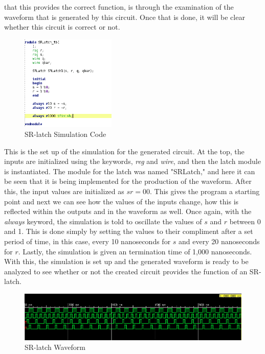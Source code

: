 \documentclass[12pt]{article}
\begin{document}
    that this provides the correct function, is through the examination of the
    waveform that is generated by this circuit. Once that is done, it will be
    clear whether this circuit is correct or not.
    \begin{figure}[h]
        \centering
        \includegraphics[width=0.4\textwidth]{SRLatch Simulation Code.png}
        \caption{SR-latch Simulation Code}
    \end{figure}
    \par This is the set up of the simulation for the generated circuit. At the
    top, the inputs are initialized using the keywords, \textit{reg} and
    \textit{wire}, and then the latch module is instantiated. The module for the
    latch was named "SRLatch," and here it can be seen that it is being
    implemented for the production of the waveform. After this, the input values
    are initialized as $s r = 00$. This gives the program a starting point and
    next we can see how the values of the inputs change, how this is reflected
    within the outputs and in the waveform as well. Once again, with the
    \textit{always} keyword, the simulation is told to oscillate the values of
    $s$ and $r$ between 0 and 1. This is done simply by setting the values to
    their compliment after a set period of time, in this case, every 10
    nanoseconds for $s$ and every 20 nanoseconds for $r$. Lastly, the simulation
    is given an termination time of 1,000 nanoseconds. With this, the simulation
    is set up and the generated waveform is ready to be analyzed to see whether
    or not the created circuit provides the function of an SR-latch.
    \begin{figure}[h]
        \centering
        \includegraphics[width=1.0\textwidth]{SRLatch Waveform.png}
        \caption{SR-latch Waveform}
    \end{figure}
\end{document}
